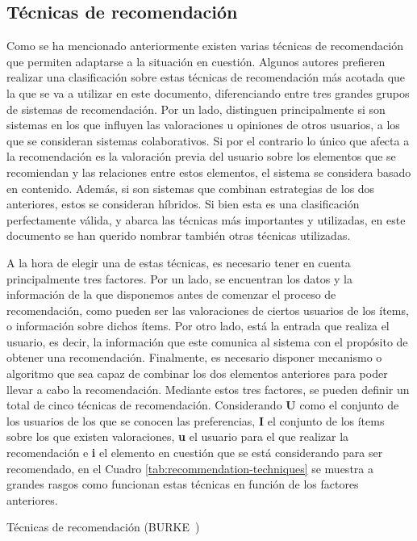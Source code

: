 \subsection{Técnicas de recomendación}
\label{sec:tecnicas-recomendacion}
Como se ha mencionado anteriormente existen varias técnicas de recomendación que permiten adaptarse a la situación en cuestión. Algunos autores prefieren realizar una clasificación sobre estas técnicas de recomendación más acotada que la que se va a utilizar en este documento\cite{Balabanovic:1997:FCC:245108.245124}, diferenciando entre tres grandes grupos de sistemas de recomendación. Por un lado, distinguen principalmente si son sistemas en los que influyen las valoraciones u opiniones de otros usuarios, a los que se consideran sistemas colaborativos. Si por el contrario lo único que afecta a la recomendación es la valoración previa del usuario sobre los elementos que se recomiendan y las relaciones entre estos elementos, el sistema se considera basado en contenido. Además, si son sistemas que combinan estrategias de los dos anteriores, estos se consideran híbridos. Si bien esta es una clasificación perfectamente válida, y abarca las técnicas más importantes y utilizadas, en este documento se han querido nombrar también otras técnicas utilizadas.


A la hora de elegir una de estas técnicas, es necesario tener en cuenta principalmente tres factores. Por un lado, se encuentran los datos y la información de la que disponemos antes de comenzar el proceso de recomendación, como pueden ser las valoraciones de ciertos usuarios de los ítems, o información sobre dichos ítems. Por otro lado, está la entrada que realiza el usuario, es decir, la información que este comunica al sistema con el propósito de obtener una recomendación. Finalmente, es necesario disponer mecanismo o algoritmo que sea capaz de combinar los dos elementos anteriores para poder llevar a cabo la recomendación. Mediante estos tres factores, se pueden definir un total de cinco técnicas de recomendación. Considerando \textbf{U} como el conjunto de los usuarios de los que se conocen las preferencias, \textbf{I} el conjunto de los ítems sobre los que existen valoraciones, \textbf{u} el usuario para el que realizar la recomendación e \textbf{i} el elemento en cuestión que se está considerando para ser recomendado, en el Cuadro \ref{tab:recommendation-techniques} se muestra a grandes rasgos como funcionan estas técnicas en función de los factores anteriores. 


\begin{table}[hp]
  \centering
  {\small
  
  }
  \caption[Técnicas de recomendación]
  {Técnicas de recomendación
    (\textsc{BURKE}~\cite{Burke})}
  \label{tab:recommendation-techniques}
\end{table}

